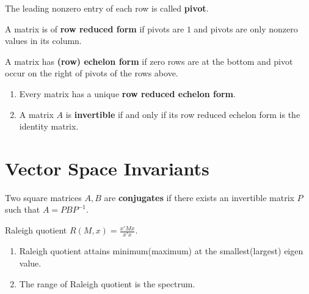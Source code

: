 \begin{definition}
	The leading nonzero entry of each row is called \textbf{pivot}.
\end{definition}
\begin{definition}
	A matrix is of \textbf{row reduced form} if pivots are $1$ and pivots are only nonzero values in its column.
\end{definition}
\begin{definition}
	A matrix has \textbf{(row) echelon form} if zero rows are at the bottom and pivot occur on the right of pivots of the rows above.
\end{definition}
\begin{enumerate}
	\item Every matrix has a unique \textbf{row reduced echelon form}.
	\item A matrix $A$ is \textbf{invertible} if and only if its row reduced echelon form is the identity matrix.
\end{enumerate}

\section{Vector Space Invariants}
\begin{definition}[conjugation]
	Two square matrices $A,B$ are \textbf{conjugates} if there exists an invertible matrix $P$ such that $A = PBP^{-1}$.
\end{definition}

\begin{definition}
	Raleigh quotient $R(M,x) = \frac{x'Mx}{x'x}$.
\end{definition}
\begin{enumerate}	
	\item Raleigh quotient attains minimum(maximum) at the smallest(largest) eigen value.
	\item The range of Raleigh quotient is the spectrum.
\end{enumerate}	

